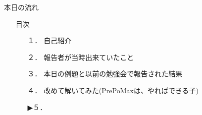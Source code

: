 \begin{frame}{本日の流れ}
  \begin{itemize}
      \item[] 目次
      \begin{itemize}[itemsep=1.3ex, leftmargin=1cm]
        \item[１．] {\color{cud_lightgray} 自己紹介}
        \item[２．] {\color{cud_lightgray} 報告者が当時出来ていたこと}
        \item[３．] {\color{cud_lightgray} 本日の例題と以前の勉強会で報告された結果}
        \item[４．] {\color{cud_lightgray} 改めて解いてみた(PrePoMaxは、やればできる子)}
        \item[▶５．] 
      \end{itemize}
  \end{itemize}
\end{frame}
